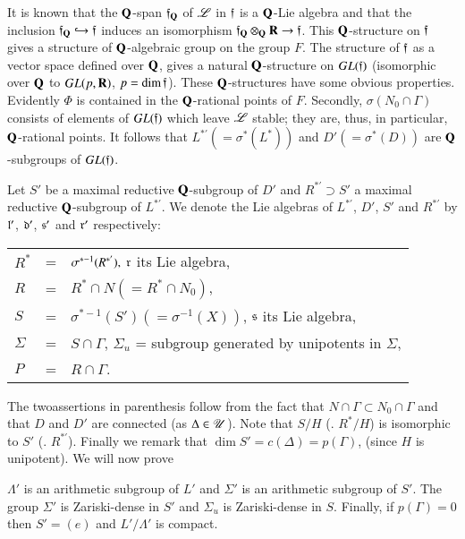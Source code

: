 It is known that the $\mathbf{Q}$-span $\mathfrak{f}_{\mathbf{Q}}$ of $\mathscr{L}$ in $\mathfrak{f}$ is a $\mathbf{Q}$-Lie algebra and that the inclusion $\mathfrak{f}_{\mathbf{Q}} \hookrightarrow \mathfrak{f}$ induces an isomorphism $\mathfrak{f}_{\mathbf{Q}} \otimes_{\mathbf{Q}} \mathbf{R} \to \mathfrak{f}$. This $\mathbf{Q}$-structure on $\mathfrak{f}$ gives a structure of $\mathbf{Q}$-algebraic group on the group $F$. The structure of $\mathfrak{f}$ as a vector space defined over $\mathbf{Q}$, gives a natural $\mathbf{Q}$-structure on $GL(\mathfrak{f})$ (isomorphic over $\mathbf{Q}$ to $GL(p,\mathbf{R})$, $p = \dim \mathfrak{f}$). These $\mathbf{Q}$-structures have some obvious properties. Evidently $\Phi$ is contained in the $\mathbf{Q}$-rational points of $F$. Secondly, $\sigma (N_0 \cap \Gamma)$ consists of elements of $GL(\mathfrak{f})$ which leave $\mathscr{L}$ stable; they are, thus, in particular, $\mathbf{Q}$-rational points. It follows that $L^{\ast'} (= \sigma^\ast (L^\ast))$ and $D'(= \sigma^\ast(D))$ are $\mathbf{Q}$-subgroups of $GL(\mathfrak{f})$.

Let $S'$ be a maximal reductive $\mathbf{Q}$-subgroup of $D'$ and $R^{\ast'} \supset S'$ a maximal reductive $\mathbf{Q}$-subgroup of $L^{\ast'}$. We denote the Lie algebras of $L^{\ast'}$, $D'$, $S'$ and $R^{\ast'}$ by $\mathfrak{l}'$, $\mathfrak{d}'$, $\mathfrak{s}'$ and $\mathfrak{r}'$ respectively:

\medskip
\begin{tabular}[l]{l@{\;}c@{\;}l}
$R^\ast$ & = & $\sigma^{\ast-1} (R^{\ast'}), \; \mathfrak{r}$ its Lie algebra,\\
$R$ & = & $R^\ast \cap N (= R^\ast \cap N_0)$,\\
$S$ &  = & $\sigma^{\ast-1} (S') (= \sigma^{-1} (X))$, $\mathfrak{s}$ its Lie algebra,\\
$\Sigma$ & = & $S \cap \Gamma$, $\Sigma_u$ = subgroup generated by unipotents in $\Sigma$,\\
$P$  & = & $R \cap \Gamma$.
\end{tabular}

\medskip
The two\pageoriginale assertions in parenthesis follow from the fact that $N \cap \Gamma \subset N_0 \cap \Gamma$ and that $D$ and $D'$ are connected (as $\Delta \in \mathscr{U}$). Note that $S/H$ (\resp. $R^\ast/H$) is isomorphic to $S'$ (\resp. $R^{\ast'}$). Finally we remark that $\dim S' = c(\Delta) =p (\Gamma)$, (since $H$ is unipotent). We will now prove

\setcounter{proposition}{17}
\begin{proposition}\label{art9-prop2.18}
$\Lambda'$ is an arithmetic subgroup of $L'$ and $\Sigma'$ is an arithmetic subgroup of $S'$. The group $\Sigma'$ is Zariski-dense in $S'$ and $\Sigma_u$ is Zariski-dense in $S$. Finally, if $p (\Gamma) =0$ then $S' = (e)$ and $L'/\Lambda'$ is compact.
\end{proposition}

